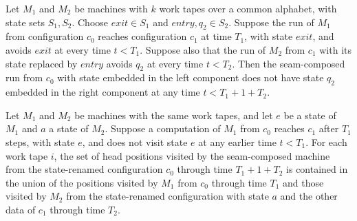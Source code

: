\begin{lemma}
\label{Turing.seamComp_firstReturn_general}
\leanok
{}
Let $M_1$ and $M_2$ be machines with $k$ work tapes over a common alphabet, with state
sets $S_1,S_2$. Choose $exit\in S_1$ and $entry,q_2\in S_2$. Suppose the run of $M_1$
from configuration $c_0$ reaches configuration $c_1$ at time $T_1$, with state $exit$,
and avoids $exit$ at every time $t<T_1$. Suppose also that the run of $M_2$ from $c_1$
with its state replaced by $entry$ avoids $q_2$ at every time $t<T_2$. Then the
seam-composed run from $c_0$ with state embedded in the left component does not have
state $q_2$ embedded in the right component at any time $t<T_1+1+T_2$.
\end{lemma}

\begin{lemma}
\label{Turing.seamComp_visited_general}
\leanok
{}
Let $M_1$ and $M_2$ be machines with the same work tapes, and let $e$ be a state of
$M_1$ and $a$ a state of $M_2$. Suppose a computation of $M_1$ from $c_0$ reaches $c_1$
after $T_1$ steps, with state $e$, and does not visit state $e$ at any earlier time
$t<T_1$. For each work tape $i$, the set of head positions visited by the seam-composed
machine from the state-renamed configuration $c_0$ through time $T_1+1+T_2$ is contained
in the union of the positions visited by $M_1$ from $c_0$ through time $T_1$ and those
visited by $M_2$ from the state-renamed configuration with state $a$ and the other data
of $c_1$ through time $T_2$.
\end{lemma}

